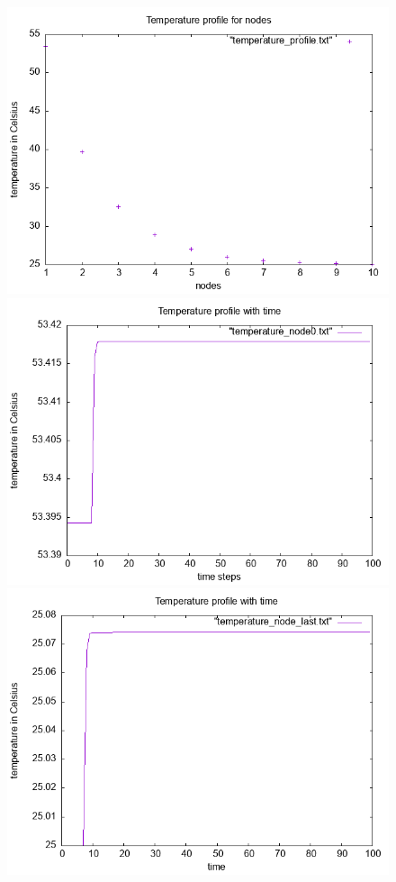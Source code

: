 \documentclass{article}
\begin{document}
\begin{figure}[ht]
\centering
\includegraphics[scale = 0.5]{figures/temperature_profile.png}
\includegraphics[scale =0.5]{figures/temperature_node0.png}
\includegraphics[scale =0.5]{figures/temperature_node_last.png}

\end{figure}
\end{document}
